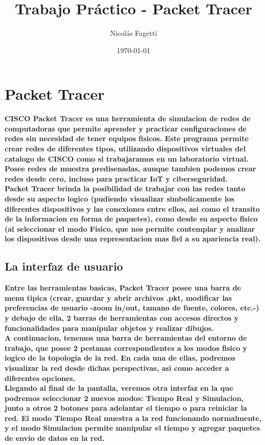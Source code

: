 \documentclass{article}
\title{Trabajo Práctico - Packet Tracer}
\author{Nicolás Fagetti}
\date{\today}
\begin{document}
\maketitle
\tableofcontents

\newpage
\section{Packet Tracer}
\textbf{CISCO Packet Tracer es una herramienta de simulacion de redes de computadoras que permite aprender y practicar configuraciones de redes sin necesidad de tener equipos fisicos. Este programa permite crear redes de diferentes tipos, utilizando dispositivos virtuales del catalogo de CISCO como si trabajaramos en un laboratorio virtual. Posee redes de muestra predisenadas, aunque tambien podemos crear redes desde cero, incluso para practicar IoT y ciberseguridad.} \\


\textbf{Packet Tracer brinda la posibilidad de trabajar con las redes tanto desde su aspecto logico (pudiendo visualizar simbolicamente los diferentes dispositivos y las conexiones entre ellos, asi como el transito de la informacion en forma de paquetes), como desde su aspecto fisico (al seleccionar el modo Fisico, que nos permite contemplar y analizar los dispositivos desde una representacion mas fiel a su apariencia real).} \\

\subsection{La interfaz de usuario}
\textbf{Entre las herramientas basicas, Packet Tracer posee una barra de menu tipica (crear, guardar y abrir archivos .pkt, modificar las preferencias de usuario -zoom in/out, tamano de fuente, colores, etc.-) y debajo de ella, 2 barras de herramientas con accesos directos y funcionalidades para manipular objetos y realizar dibujos.} \\

\textbf{A continuacion, tenemos una barra de herramientas del entorno de trabajo, que posee 2 pestanas correspondientes a los modos fisico y logico de la topologia de la red. En cada una de ellas, podremos visualizar la red desde dichas perspectivas, asi como acceder a diferentes opciones.} \\

\textbf{Llegando al final de la pantalla, veremos otra interfaz en la que podremos seleccionar 2 nuevos modos: Tiempo Real y Simulacion, junto a otros 2 botones para adelantar el tiempo o para reiniciar la red. El modo Tiempo Real muestra a la red funcionando normalmente, y el modo Simulacion permite manipular el tiempo y agregar paquetes de envio de datos en la red.} \\
\end{document}

